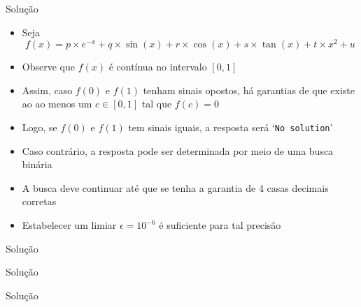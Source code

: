 \begin{frame}[fragile]{Solução}

    \begin{itemize}
        \item Seja
        \[
            f(x) = p\times e^{-x} + q\times \sin(x) + r\times \cos(x) + s\times \tan(x) + t\times x^2 + u
        \]

        \item Observe que $f(x)$ é contínua no intervalo $[0, 1]$

        \item Assim, caso $f(0)$ e $f(1)$ tenham sinais opostos, há garantias de que existe ao
            ao menos um $c \in [0, 1]$ tal que $f(c) = 0$ 

        \item Logo, se $f(0)$ e $f(1)$ tem sinais iguais, a resposta será `\texttt{No solution}'

        \item Caso contrário, a resposta pode ser determinada por meio de uma busca binária

        \item A busca deve continuar até que se tenha a garantia de 4 casas decimais corretas

        \item Estabelecer um limiar $\epsilon = 10^{-6}$ é suficiente para tal precisão
   \end{itemize}

\end{frame}

\begin{frame}[fragile]{Solução}
\end{frame}

\begin{frame}[fragile]{Solução}
\end{frame}

\begin{frame}[fragile]{Solução}
\end{frame}
